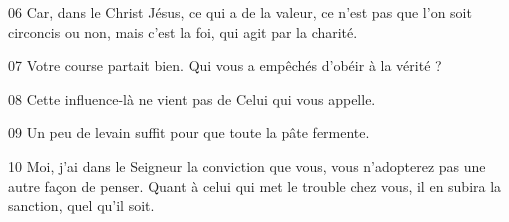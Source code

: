 
06 Car, dans le Christ Jésus, ce qui a de la valeur, ce n’est pas que l’on soit circoncis ou non, mais c’est la foi, qui agit par la charité.

07 Votre course partait bien. Qui vous a empêchés d’obéir à la vérité ?

08 Cette influence-là ne vient pas de Celui qui vous appelle.

09 Un peu de levain suffit pour que toute la pâte fermente.

10 Moi, j’ai dans le Seigneur la conviction que vous, vous n’adopterez pas une autre façon de penser. Quant à celui qui met le trouble chez vous, il en subira la sanction, quel qu’il soit.
